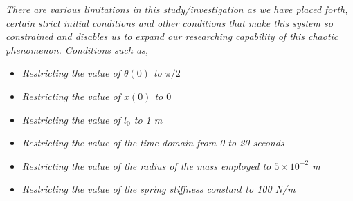 \textit{There are various limitations in this study/investigation as we have placed forth, certain strict initial conditions and other conditions that make this system so constrained and disables us to expand our researching capability of this chaotic phenomenon. Conditions such as,}
        
    \begin{itemize}
        \item \textit{Restricting the value of $\theta(0)$ to $\pi/2$}
        \item \textit{Restricting the value of $x(0)$ to $0$}
        \item \textit{Restricting the value of $l_0$ to 1 m}
        \item \textit{Restricting the value of the time domain from 0 to 20 seconds}
        \item \textit{Restricting the value of the radius of the mass employed to $5\times10^{-2}$ m}
        \item \textit{Restricting the value of the spring stiffness constant to 100 N/m}
    \end{itemize}
        
        

